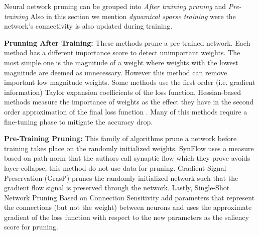 
Neural network pruning can be grouped into \textit{After training pruning}
and  \textit{Pre-training } 
Also in this section we mention \textit{dynamical sparse training} were the
network's
connectivity  is also updated during training.

\textbf{Prunning After Training:} These methods prune a pre-trained network.
Each method has a different importance score to detect unimportant weights.
The most simple one is the magnitude of a weight
\cite{hanLearningBothWeights2015a,hanDeepCompressionCompressing2016a} where
weights with the lowest magnitude are deemed as
 unnecessary. However this method can remove important low magnitude weights.
 Some methods use the first order (i.e. gradient information) Taylor expansion
 coefficients of the loss function\cite{karninsimpleprocedurepruning1990a,mozerskeletonizationtechniquetrimming1988}.
 Hessian-based methods measure the importance of weights as the effect they
 have in the second order approximation of the final loss function 
 \cite{hassibiSecondOrderDerivatives1992,lecunOptimalBrainDamage1989,
 hassibiOptimalBrainSurgeon1993,singhWoodFisherEfficientSecondOrder2020}.
 Many of this methods require a fine-tuning phase to mitigate the accuracy
 drop.




\textbf{Pre-Training Pruning:} This family of algorithms prune a
network before training takes place on the randomly initialized weights. SynFlow
\cite{tanakaPruningNeuralNetworks2020a} uses a measure based on path-norm
\cite{neyshaburPathSGDPathNormalizedOptimization2015} that the authors call
synaptic flow which they prove avoids layer-collapse, this method do not use
data for pruning. Gradient Signal Preservation
(GrasP) \cite{wangPickingWinningTickets2020} prunes the randomly initialized network such that the
gradient flow signal is preserved through the network.
Lastly, Single-Shot Network Pruning Based on Connection Sensitivity
\cite{leeSNIPSINGLESHOTNETWORK2018} add parameters that represent the
connections (but not the weight) between neurons and uses the approximate
gradient of the loss function with respect to the new parameters as the
saliency score for pruning. 

